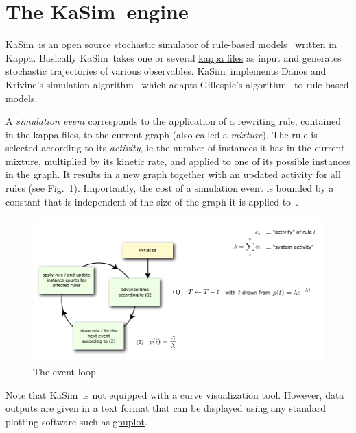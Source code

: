 \documentclass[11pt]{book}
\def\KaSim{\textsf{KaSim}}
\def\ie{ie }
\begin{document}
\section{The \KaSim~engine}
\KaSim~is an open source stochastic simulator of rule-based models~\cite{DanLan04,Dan_etal07a,Fae_etal05} written in Kappa. Basically \KaSim~takes one or several \hyperref[chap:kappa]{kappa files} as input and generates stochastic trajectories of various observables. \KaSim~implements Danos and Krivine's simulation algorithm~\cite{Dan_etal07b} which adapts Gillespie's algorithm~\cite{Gil76,Gil77} to rule-based models. 

A \emph{simulation event} corresponds to the application of a rewriting rule, contained in the kappa files, to the current graph (also called a \emph{mixture}). The rule is selected according to its \emph{activity}, \ie the number of instances it has in the current mixture, multiplied by its kinetic rate, and applied to one of its possible instances in the graph. It results in a new graph together with an updated activity for all rules (see Fig.~\ref{fig:event-loop}). Importantly, the cost of a simulation event is bounded by a constant that is independent of the size of the graph it is applied to~\cite{Dan_etal07b}. 

\begin{figure}[htbp]
\begin{center}
\includegraphics[width=14cm]{img/event-loop.png}
\caption{The event loop}
\label{fig:event-loop}
\end{center}
\end{figure}

Note that \KaSim~is not equipped with a curve visualization tool. However, data outputs are given in a text format that can be displayed using any standard plotting software such as \href{http://www.gnuplot.info/}{gnuplot}.
\end{document}
